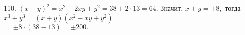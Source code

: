 110. $(x+y)^2=x^2+2xy+y^2=38+2\cdot13=64.$ Значит, $x+y=\pm8,$ тогда $x^3+y^3=(x+y)(x^2-xy+y^2)=$\\$=\pm8\cdot(38-13)=\pm200.$\\
